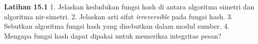\begin{obereflection}
\textbf{Latihan 15.1}
1. Jelaskan kedudukan fungsi hash di antara algoritma simetri dan algoritma
   nir-simetri.
2. Jelaskan arti sifat \textit{irreversible} pada fungsi hash.
3. Sebutkan algoritma fungsi hash yang disebutkan dalam modul sumber.
4. Mengapa fungsi hash dapat dipakai untuk memeriksa integritas pesan?
\end{obereflection}
